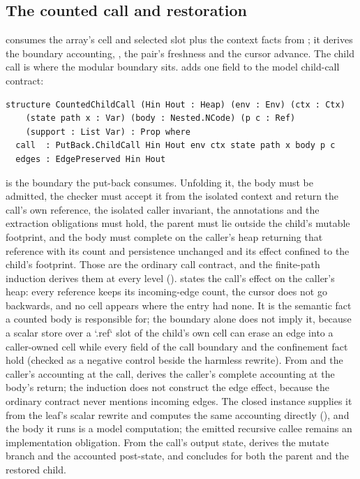 \documentclass[a4paper,UKenglish,cleveref]{lipics-v2021}
\begin{document}
\subsection{The counted call and restoration}
 consumes the array's cell and selected slot plus the
context facts from ; it derives the boundary accounting,
, the pair's freshness and the cursor advance. The child call is
where the modular boundary sits.  adds one field to the
model child-call contract:
\begin{lstlisting}
structure CountedChildCall (Hin Hout : Heap) (env : Env) (ctx : Ctx)
    (state path x : Var) (body : Nested.NCode) (p c : Ref)
    (support : List Var) : Prop where
  call  : PutBack.ChildCall Hin Hout env ctx state path x body p c
  edges : EdgePreserved Hin Hout
\end{lstlisting}
 is the boundary the put-back consumes. Unfolding it, the body must be
admitted, the checker must accept it from the isolated context and return the
call's own reference, the isolated caller invariant, the annotations and the
extraction obligations must hold, the parent must lie outside the child's mutable
footprint, and the body must complete on the caller's heap returning that
reference with its count and persistence unchanged and its effect confined to the
child's footprint. Those are the ordinary call contract, and the finite-path
induction derives them at every level ().
 states the call's effect on the caller's heap: every reference keeps
its incoming-edge count, the cursor does not go backwards, and no cell appears
where the entry had none. It is the semantic fact a counted body is responsible
for; the boundary alone does not imply it, because a scalar store over a
`.ref` slot of the child's own cell can erase an edge into a caller-owned
cell while every field of the call boundary and the confinement fact hold (checked
as a negative control beside the harmless rewrite). From  and the
caller's accounting at the call,  derives the caller's
complete accounting at the body's return; the induction does not construct the
edge effect, because the ordinary contract never mentions incoming edges. The
closed instance supplies it from the leaf's scalar rewrite and computes the same
accounting directly (), and the body it runs
is a model computation; the emitted recursive callee remains an implementation
obligation.
From the call's output state, 
derives the mutate branch and the accounted post-state, and
 concludes  for both
the parent and the restored child.
\end{document}
